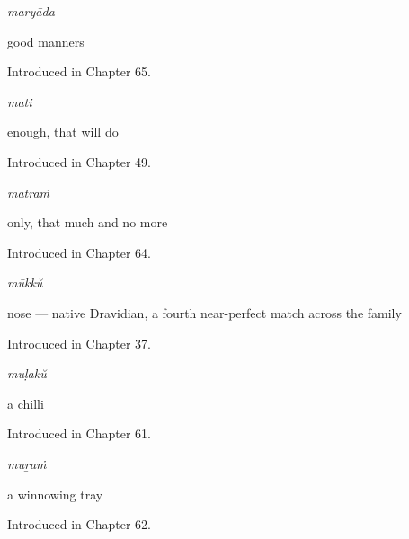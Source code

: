 \noindent\begin{minipage}[t]{\linewidth}
\raggedright
\textbf{}\enspace\emph{maryāda}\par
\small good manners\par
\footnotesize Introduced in Chapter 65.
\end{minipage}\par\medskip

\noindent\begin{minipage}[t]{\linewidth}
\raggedright
\textbf{}\enspace\emph{mati}\par
\small enough, that will do\par
\footnotesize Introduced in Chapter 49.
\end{minipage}\par\medskip

\noindent\begin{minipage}[t]{\linewidth}
\raggedright
\textbf{}\enspace\emph{mātraṁ}\par
\small only, that much and no more\par
\footnotesize Introduced in Chapter 64.
\end{minipage}\par\medskip

\noindent\begin{minipage}[t]{\linewidth}
\raggedright
\textbf{}\enspace\emph{mūkkŭ}\par
\small nose — native Dravidian, a fourth near-perfect match across the family\par
\footnotesize Introduced in Chapter 37.
\end{minipage}\par\medskip

\noindent\begin{minipage}[t]{\linewidth}
\raggedright
\textbf{}\enspace\emph{muḷakŭ}\par
\small a chilli\par
\footnotesize Introduced in Chapter 61.
\end{minipage}\par\medskip

\noindent\begin{minipage}[t]{\linewidth}
\raggedright
\textbf{}\enspace\emph{muṟaṁ}\par
\small a winnowing tray\par
\footnotesize Introduced in Chapter 62.
\end{minipage}\par\medskip

